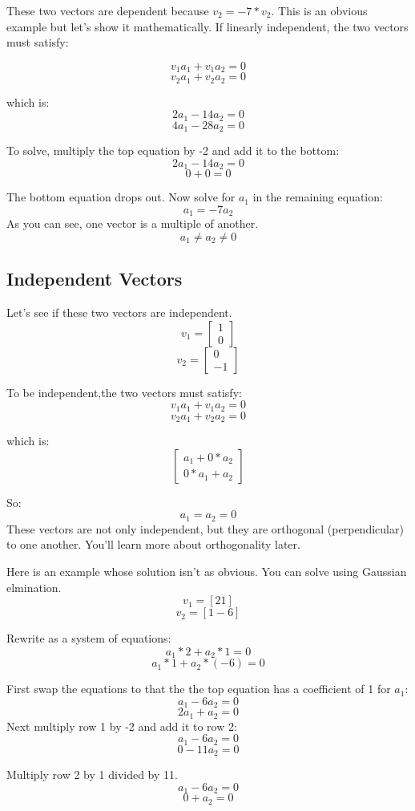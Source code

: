 These two vectors are dependent because $v_2 = -7*v_2$. This is an obvious example but let's show it mathematically. If linearly independent, the two vectors must satisfy:

	$$v_1a_1 + v_1a_2 = 0$$
	$$v_2a_1 + v_2a_2 = 0$$

which is:
	$$2a_1 -14a_2 = 0$$
	$$4a_1 -28a_2 = 0$$

To solve, multiply the top equation by -2 and add it to the bottom: 
$$2a_1 - 14a_2 = 0 $$
$$ 0  + 0     = 0 $$

The bottom equation drops out. Now  solve for $a_1$ in the remaining equation:
$$a_1 = -7a_2$$
As you can see, one vector is a multiple of another. $$a_1 \neq a_2 \neq 0$$

\subsection{Independent Vectors}
Let's see if these two vectors are independent.
$$v_1 = \begin{bmatrix}
1 \\
0
\end{bmatrix}$$
$$v_2 = \begin{bmatrix}
0 \\
-1
\end{bmatrix}$$

To be independent,the two vectors must satisfy:
	$$v_1a_1 + v_1a_2 = 0$$
	$$v_2a_1 + v_2a_2 = 0$$
	
which is:
$$\begin{bmatrix}
	a_1 + 0*a_2 \\
	0*a_1 + a_2
\end{bmatrix}$$

So:
$$a_1 = a_2 = 0$$
These vectors are not only independent, but they are orthogonal (perpendicular) to one another. You'll learn more about orthogonality later.

Here is an example whose solution isn't as obvious. You can solve using Gaussian elmination.
$$v_1 = [2 1]$$
$$v_2 = [1 -6]$$

Rewrite as a system of equations:
$$a_1*2 + a_2*1 = 0 $$
$$a_1*1 + a_2*(-6) = 0$$

First swap the equations to that the the top equation has a coefficient of 1 for $a_1$:
$$a_1 - 6a_2 = 0$$ 
$$2a_1 + a_2 = 0$$ 
Next multiply row 1 by -2 and add it to row 2:
$$a_1 - 6a_2 = 0$$ 
$$0  - 11a_2 = 0$$ 

Multiply row 2 by 1 divided by 11.
$$a_1 - 6a_2 = 0$$ 
$$0 + a_2 = 0$$ 

